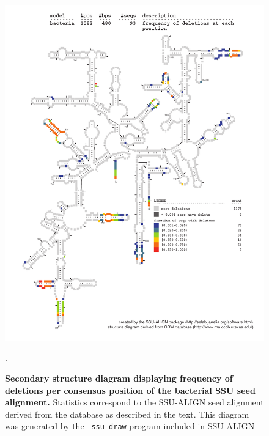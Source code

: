 \begin{figure}
\begin{center}
\includegraphics[width=5.7in]{Figures/bacteria-0p1-dall}
\end{center}
\caption[Secondary structure diagram displaying frequency of deletions
  per consensus position of the bacterial SSU seed
  alignment]{\textbf{Secondary structure diagram displaying frequency 
  of deletions per consensus position of the bacterial SSU seed
  alignment.} Statistics correspond to the SSU-ALIGN seed
  alignment derived from the  database \cite{CannoneGutell02}
  as described in the text. This diagram was generated by the {\tt
  ssu-draw} program included in SSU-ALIGN}.
\label{fig:bacdel}
\end{figure}

\newpage 

